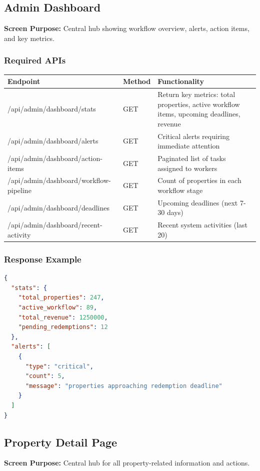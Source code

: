 \documentclass[11pt,a4paper]{article}
\begin{document}
\subsection{Admin Dashboard}

\textbf{Screen Purpose:} Central hub showing workflow overview, alerts, action items, and key metrics.

\subsubsection{Required APIs}

\begin{longtable}{|p{4cm}|p{2cm}|p{7cm}|}
\hline
\textbf{Endpoint} & \textbf{Method} & \textbf{Functionality} \\
\hline
/api/admin/dashboard/stats & GET & Return key metrics: total properties, active workflow items, upcoming deadlines, revenue \\
/api/admin/dashboard/alerts & GET & Critical alerts requiring immediate attention \\
/api/admin/dashboard/action-items & GET & Paginated list of tasks assigned to workers \\
/api/admin/dashboard/workflow-pipeline & GET & Count of properties in each workflow stage \\
/api/admin/dashboard/deadlines & GET & Upcoming deadlines (next 7-30 days) \\
/api/admin/dashboard/recent-activity & GET & Recent system activities (last 20) \\
\hline
\end{longtable}

\subsubsection{Response Example}
\begin{lstlisting}[language=json]
{
  "stats": {
    "total_properties": 247,
    "active_workflow": 89,
    "total_revenue": 1250000,
    "pending_redemptions": 12
  },
  "alerts": [
    {
      "type": "critical",
      "count": 5,
      "message": "properties approaching redemption deadline"
    }
  ]
}
\end{lstlisting}

\subsection{Property Detail Page}

\textbf{Screen Purpose:} Central hub for all property-related information and actions.
\end{document}

